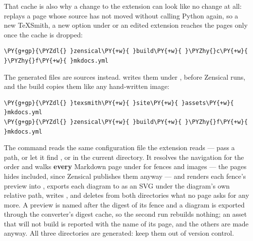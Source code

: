 \documentclass[a4paper,twoside]{article}
\begin{document}
That cache is also why a change to the extension can look like no change at
all:  replays a page whose source has not moved without calling Python
again, so a new TeXSmith, a new option under  or an edited extension
reaches the pages only once the cache is dropped:
\begin{tscode}[lang=console, engine=pygments]
\begin{Verbatim}[commandchars=\\\{\},breaklines, breakanywhere, commandchars=\\\{\}]
\PY{g+gp}{\PYZdl{} }zensical\PY{+w}{ }build\PY{+w}{ }\PYZhy{}c\PY{+w}{ }\PYZhy{}f\PY{+w}{ }mkdocs.yml
\end{Verbatim}
\end{tscode}
The generated files are sources instead.  writes them
under , before Zensical runs, and the build copies them like any
hand-written image:
\begin{tscode}[lang=console, engine=pygments]
\begin{Verbatim}[commandchars=\\\{\},breaklines, breakanywhere, commandchars=\\\{\}]
\PY{g+gp}{\PYZdl{} }texsmith\PY{+w}{ }site\PY{+w}{ }assets\PY{+w}{ }mkdocs.yml
\PY{g+gp}{\PYZdl{} }zensical\PY{+w}{ }build\PY{+w}{ }\PYZhy{}f\PY{+w}{ }mkdocs.yml
\end{Verbatim}
\end{tscode}
The command reads the same configuration file the extension reads --- pass a
path, or let it find ,  or  in the
current directory. It resolves the navigation for the order and walks \textbf{every}
Markdown page under  for  fences and  images --- the
pages  hides included, since Zensical publishes them anyway --- and
renders each fence's preview into
, exports each diagram to  as an
SVG under the diagram's own relative path, writes
, and deletes from both directories what no
page asks for any more. A preview is named after the digest of its fence and a
diagram is exported through the converter's digest cache, so the second run
rebuilds nothing; an asset that will not build is reported with the name of its
page, and the others are made anyway. All three directories are generated:
keep them out of version control.
\end{document}
